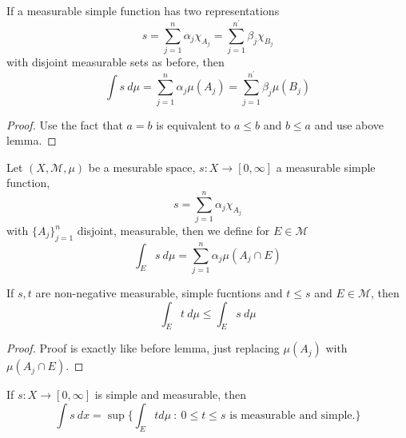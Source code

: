 \begin{corollary}
  If a measurable simple function has two representations \[
      s = \sum_{j = 1}^{n} \alpha_j \chi_{A_j} = \sum_{j = 1}^{n^\prime} \beta_j \chi_{B_j}
  \]
  with disjoint measurable sets as before, then \[
    \int s \ d \mu = \sum_{j = 1}^{n} \alpha_j \mu(A_j) = \sum_{ j = 1}^{n^\prime} \beta_j \mu(B_j)
  \]
\end{corollary}
\begin{proof}
   Use the fact that $a = b$ is equivalent to $ a \le b$ and $ b \le a$ and use above lemma.
\end{proof}

\begin{definition}
  Let $(X, \mathcal{M}, \mu)$ be a mesurable space, $s: X \to [0, \infty]$ a measurable simple function, \[
      s = \sum_{j = 1}^{n} \alpha_j \chi_{A_j}
  \]
  with $\{ A_j \}_{j=1}^n$ disjoint, measurable, then we define for $E \in \mathcal{M}$ \[
    \int_E s \ d \mu = \sum_{j = 1}^{n} \alpha_j \mu(A_j \cap E)
  \]
\end{definition}

\begin{lemma}
   If $s, t$ are non-negative measurable, simple fucntions and $t \le s$ and $E \in \mathcal{M}$, then \[
       \int_E t \ d \mu \le \int_E s \ d \mu
   \]
\end{lemma}
\begin{proof}
  Proof is exactly like before lemma, just replacing $\mu(A_j)$ with $\mu(A_j \cap E)$.
\end{proof}

\begin{remark}
  If $s: X \to [0, \infty]$ is simple and measurable, then   \[
      \int s \ dx = \sup \{ \int_E t d \mu \ : \ 0 \le t \le s \textrm{ is measurable and simple.} \}
  \]
\end{remark}

